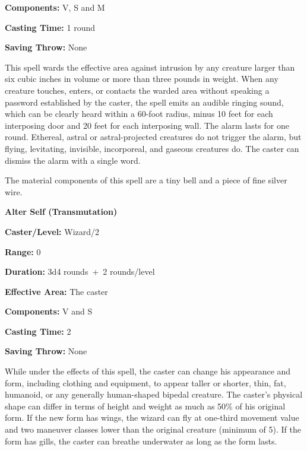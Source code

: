 \begin{multicols}{2}
\begin{minipage}{\columnwidth}
\noindent \textbf{Components:} V, S and M

\noindent \textbf{Casting Time:} 1 round

\noindent \textbf{Saving Throw:} None

\end{minipage}

This spell wards the effective area against intrusion by any creature larger than six cubic inches in volume or more than three pounds in weight.  When any creature touches, enters, or contacts the warded area without speaking a password established by the caster, the spell emits an audible ringing sound, which can be clearly heard within a 60-foot radius, minus 10 feet for each interposing door and 20 feet for each interposing wall.  The alarm lasts for one round.  Ethereal, astral or astral-projected creatures do not trigger the alarm, but flying, levitating, invisible, incorporeal, and gaseous creatures do.  The caster can dismiss the alarm with a single word.  

The material components of this spell are a tiny bell and a piece of fine silver wire.

\vspace{1em}
 
\noindent
\begin{minipage}{\columnwidth}

\noindent \textbf{Alter Self (Transmutation)}

\noindent \textbf{Caster/Level:} Wizard/2

\noindent \textbf{Range:} 0

\noindent \textbf{Duration:} 3d4 rounds~+~2 rounds/level 

\noindent \textbf{Effective Area:} The caster

\noindent \textbf{Components:} V and S

\noindent \textbf{Casting Time:} 2

\noindent \textbf{Saving Throw:} None

\end{minipage}

While under the effects of this spell, the caster can change his appearance and form, including clothing and equipment, to appear taller or shorter, thin, fat, humanoid, or any generally human-shaped bipedal creature.  The caster's physical shape can differ in terms of height and weight as much as 50\% of his original form.  If the new form has wings, the wizard can fly at one-third movement value and two maneuver classes lower than the original creature (minimum of 5).  If the form has gills, the caster can breathe underwater as long as the form lasts.  


\end{multicols}
